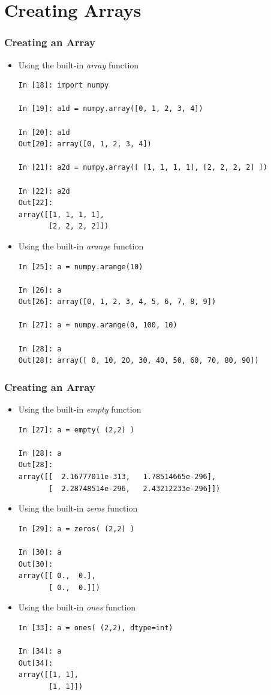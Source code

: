 \documentclass{beamer}
\begin{document}
\section{Creating Arrays}
\begin{frame}[fragile]
\frametitle{Creating an Array}
\begin{itemize}
  \item{Using the built-in \emph{array} function}
  \begin{lstlisting}
In [18]: import numpy

In [19]: a1d = numpy.array([0, 1, 2, 3, 4])

In [20]: a1d
Out[20]: array([0, 1, 2, 3, 4])

In [21]: a2d = numpy.array([ [1, 1, 1, 1], [2, 2, 2, 2] ])

In [22]: a2d
Out[22]:
array([[1, 1, 1, 1],
       [2, 2, 2, 2]])
  \end{lstlisting}
  \item Using the built-in \emph{arange} function
  \begin{lstlisting}
In [25]: a = numpy.arange(10)

In [26]: a
Out[26]: array([0, 1, 2, 3, 4, 5, 6, 7, 8, 9])

In [27]: a = numpy.arange(0, 100, 10)

In [28]: a
Out[28]: array([ 0, 10, 20, 30, 40, 50, 60, 70, 80, 90])
  \end{lstlisting}
\end{itemize}
\end{frame}


\begin{frame}[fragile]
\frametitle{Creating an Array}
\begin{itemize}
  \item{Using the built-in \emph{empty} function}
  \begin{lstlisting}
In [27]: a = empty( (2,2) )

In [28]: a
Out[28]:
array([[  2.16777011e-313,   1.78514665e-296],
       [  2.28748514e-296,   2.43212233e-296]])
  \end{lstlisting}
  \item Using the built-in \emph{zeros} function
  \begin{lstlisting}
In [29]: a = zeros( (2,2) )

In [30]: a
Out[30]:
array([[ 0.,  0.],
       [ 0.,  0.]])
  \end{lstlisting}
  \item Using the built-in \emph{ones} function
  \begin{lstlisting}
In [33]: a = ones( (2,2), dtype=int)

In [34]: a
Out[34]:
array([[1, 1],
       [1, 1]])
  \end{lstlisting}
\end{itemize}
\end{frame}
\end{document}
